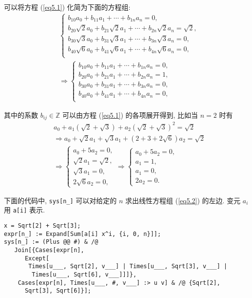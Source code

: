 \documentclass[color=black,device=normal,lang=cn,mode=geye]{elegantnote}
\begin{document}
\begin{solution}
    可以将方程 (\ref{eq5.1}) 化简为下面的方程组:
    \begin{align}\label{eq5.2}
        & \begin{cases}
            b_{10}a_0+b_{11}a_1+\cdots+b_{1n}a_n=0, \\
            b_{20}\sqrt{2}a_0+b_{21}\sqrt{2}a_1+\cdots+b_{2n}\sqrt{2}a_n=\sqrt{2}, \\
            b_{30}\sqrt{3}a_0+b_{31}\sqrt{3}a_1+\cdots+b_{3n}\sqrt{3}a_n=0, \\
            b_{40}\sqrt{6}a_0+b_{41}\sqrt{6}a_1+\cdots+b_{4n}\sqrt{6}a_n=0, \\
        \end{cases}\nonumber \\
        & \Rightarrow\begin{cases}
            b_{10}a_0+b_{11}a_1+\cdots+b_{1n}a_n=0, \\
            b_{20}a_0+b_{21}a_1+\cdots+b_{2n}a_n=1, \\
            b_{30}a_0+b_{31}a_1+\cdots+b_{3n}a_n=0, \\
            b_{40}a_0+b_{41}a_1+\cdots+b_{4n}a_n=0, \\
        \end{cases}
    \end{align}

    其中的系数 $b_{ij}\in\mathbb{Z}$ 可以由方程 (\ref{eq5.1}) 的各项展开得到, 比如当 $n=2$ 时有
    \begin{align*}
        & a_0+a_1(\sqrt{2}+\sqrt{3})+a_2(\sqrt{2}+\sqrt{3})^2=\sqrt{2} \\
        & \Rightarrow a_0+\sqrt{2}a_1+\sqrt{3}a_1+(2+3+2\sqrt{6})a_2=\sqrt{2} \\
        & \Rightarrow\begin{cases}
            a_0+5a_2=0, \\
            \sqrt{2}a_1=\sqrt{2}, \\
            \sqrt{3}a_1=0, \\
            2\sqrt{6}a_2=0,
        \end{cases}\Rightarrow\begin{cases}
            a_0+5a_2=0, \\
            a_1=1, \\
            a_1=0, \\
            2a_2=0.
        \end{cases}
    \end{align*}

    下面的代码中, \verb|sys[n_]| 可以对给定的 $n$ 求出线性方程组 (\ref{eq5.2}) 的左边. 变元 $a_i$ 用 \verb|a[i]| 表示.
    \begin{lstlisting}
x = Sqrt[2] + Sqrt[3];
expr[n_] := Expand[Sum[a[i] x^i, {i, 0, n}]];
sys[n_] := (Plus @@ #) & /@ 
   Join[{Cases[expr[n], 
      Except[
       Times[u___, Sqrt[2], v___] | Times[u___, Sqrt[3], v___] | 
        Times[u___, Sqrt[6], v___]]]}, 
    Cases[expr[n], Times[u___, #, v___] :> u v] & /@ {Sqrt[2], 
      Sqrt[3], Sqrt[6]}];\end{lstlisting}
    

\end{solution}
\end{document}
